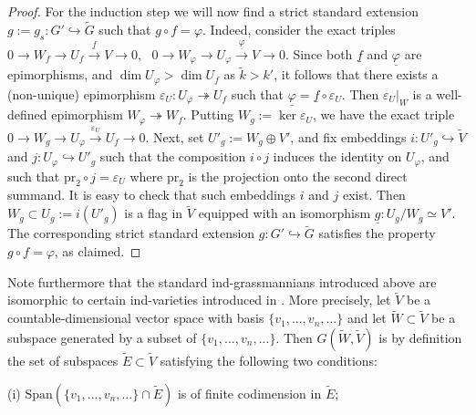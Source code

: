 \documentclass[12pt]{amsart}
\newcommand\Span{\text{Span}}
\renewcommand{\phi}{\varphi}
\theoremstyle{definition}
\begin{document}
\begin{proof}
For the induction step we will now find a strict standard extension
$g:=g_s:G'\hookrightarrow\tilde{G}$ such that $g\circ f=\phi$. Indeed,
consider the exact triples
$0\to W_f\to U_f\xrightarrow{\underline{f}}V\to0,\ \ \
0\to W_{\phi}\to U_{\phi}\xrightarrow{\underline{\phi}}V\to0$.
Since both $\underline{f}$ and $\underline{\phi}$ are epimorphisms, and $\dim U_{\phi}>\dim U_f$ as $\tilde{k}>k'$,
it follows that there exists a (non-unique) epimorphism $\varepsilon_U:U_{\phi}\twoheadrightarrow U_f$
such that $\underline{\phi}=\underline{f}\circ\varepsilon_U$.
Then $\varepsilon_U|_W$ is a well-defined epimorphism $W_{\phi}\twoheadrightarrow W_f$.
Putting $W_g:=\ker{\varepsilon_U}$, we have the exact triple
$0\to W_g\to U_{\phi}\xrightarrow{\varepsilon_U}U_f\to0$.
Next, set
$U'_g:=W_g\oplus V'$, and fix embeddings $i:U'_g\hookrightarrow\tilde{V}$ and $j:U_\phi\hookrightarrow U'_g$ such that the composition $i\circ j$ induces the identity on $U_\phi$, and such that $\text{pr}_2\circ j = \varepsilon_U$ where $\text{pr}_2$ is the projection onto the second direct summand.   It is easy to check that such embeddings $i$ and $j$ exist.
Then $W_g\subset U_g:=i(U'_g)$ is a flag in $\tilde{V}$ equipped with an isomorphism $\underline{g}:U_g/W_g\simeq V'$.
The corresponding strict standard extension $g:G'\hookrightarrow\tilde{G}$ satisfies the property $g\circ f=\phi$,
as claimed.
\end{proof}


Note furthermore that the standard ind-grassmannians introduced above are isomorphic to certain ind-varieties
introduced in \cite{DiP}. More precisely, let $\widetilde{V}$ be a countable-dimensional vector space with basis
$\{v_1,...,v_n,...\}$ and let
$\widetilde{W}\subset\widetilde{V}$ be a subspace generated by a subset of $\{v_1,...,v_n,...\}$. Then
$G(\widetilde{W},\widetilde{V})$ is by definition the set of subspaces $\widetilde{E}\subset\widetilde{V}$
satisfying the following two conditions:

(i) $\Span(\{v_1,...,v_n,...\}\cap\widetilde{E})$ is of finite codimension in $\widetilde{E}$;
\end{document}
